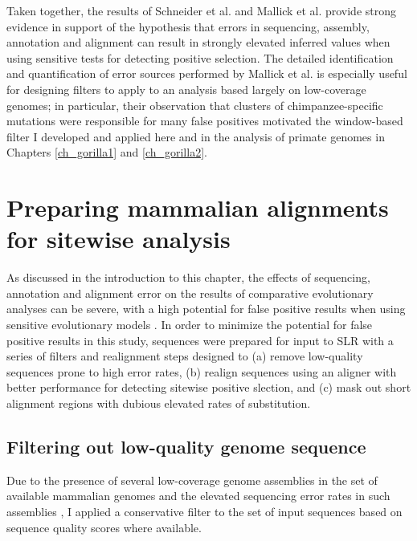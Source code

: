 Taken together, the results of Schneider et
al. \citeyearpar{Schneider2009} and Mallick et
al. \citeyearpar{Mallick2009} provide strong evidence in support of
the hypothesis that errors in sequencing, assembly, annotation and
alignment can result in strongly elevated inferred \omg values when
using sensitive tests for detecting positive selection. The detailed
identification and quantification of error sources performed by
Mallick et al. \citeyearpar{Mallick2009} is especially useful for
designing filters to apply to an analysis based largely on
low-coverage genomes; in particular, their observation that clusters
of chimpanzee-specific mutations were responsible for many false
positives motivated the window-based filter I developed and applied
here and in the analysis of primate genomes in Chapters
\ref{ch_gorilla1} and \ref{ch_gorilla2}.


\section{Preparing mammalian alignments for sitewise analysis}

As discussed in the introduction to this chapter, the effects of
sequencing, annotation and alignment error on the results of
comparative evolutionary analyses can be severe, with a high potential
for false positive results when using sensitive evolutionary models
\citep{Mallick2009,Schneider2009}. In order to minimize the potential
for false positive results in this study, sequences were prepared for
input to SLR with a series of filters and realignment steps designed
to (a) remove low-quality sequences prone to high error rates, (b)
realign sequences using an aligner with better performance for
detecting sitewise positive slection, and (c) mask out short alignment
regions with dubious elevated rates of \nsyn substitution.

\subsection{Filtering out low-quality genome sequence}

Due to the presence of several low-coverage genome assemblies in the
set of available mammalian genomes and the elevated sequencing error
rates in such assemblies \citep{Hubbard2007}, I applied a conservative
filter to the set of input sequences based on sequence quality scores
where available.

